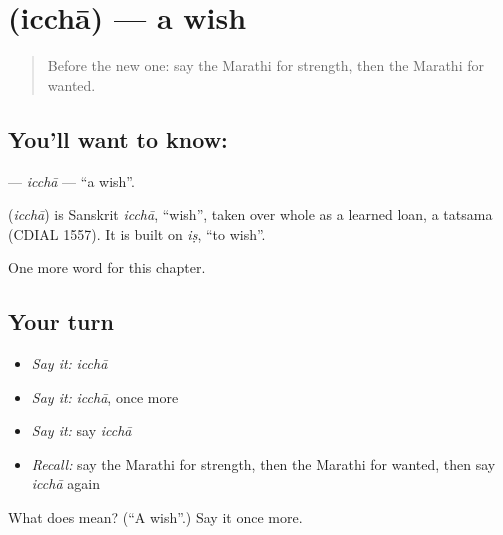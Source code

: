 \section[\texorpdfstring{\mr{इच्छा} (icchā)}{इच्छा (icchā)}]{ (icchā) — a wish}

\label{lesson:MR-C122-iccha}



\begin{quote}
Before the new one: say the Marathi for strength, then the Marathi for wanted.
\end{quote}

\subsection*{You'll want to know: }
\textbf{} — \emph{icchā} — \textquotedblleft{}a wish\textquotedblright{}.

\begin{cousinweb}
\textbf{} (\emph{icchā}) is Sanskrit \emph{icchā}, \textquotedblleft{}wish\textquotedblright{}, taken over whole as a learned loan, a tatsama (CDIAL 1557). It is built on \emph{iṣ}, \textquotedblleft{}to wish\textquotedblright{}.
\end{cousinweb}

\begin{grammarlens}[title={What you've built}]
One more word for this chapter.
\end{grammarlens}

\subsection*{Your turn}
\begin{itemize}
\raggedright
  \item \emph{Say it:} \emph{icchā}
  \item \emph{Say it:} \emph{icchā}, once more
  \item \emph{Say it:} say \emph{icchā}
  \item \emph{Recall:} say the Marathi for strength, then the Marathi for wanted, then say \emph{icchā} again
\end{itemize}

\begin{tcolorbox}[breakable,colback=teal!4,colframe=teal!35!black,title={Before you move on}]
What does  mean? (\textquotedblleft{}A wish\textquotedblright{}.) Say it once more.
\end{tcolorbox}
